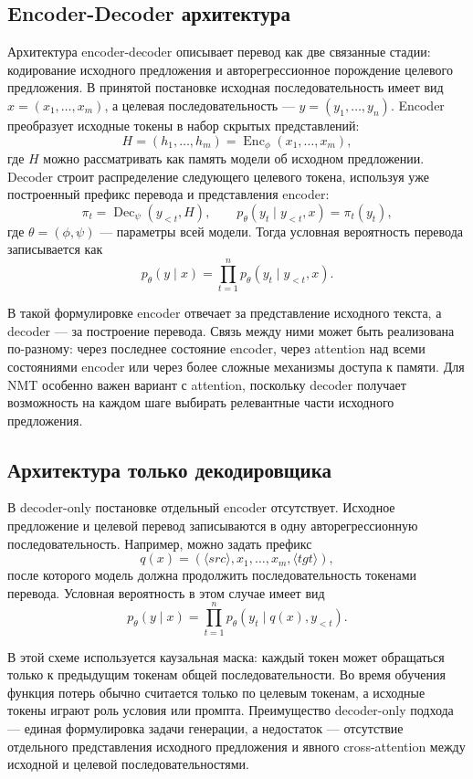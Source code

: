 \subsection{Encoder-Decoder архитектура}

Архитектура encoder-decoder описывает перевод как две связанные стадии: кодирование исходного предложения и авторегрессионное порождение целевого предложения.
В принятой постановке исходная последовательность имеет вид $x = (x_1, \ldots, x_m)$, а целевая последовательность --- $y = (y_1, \ldots, y_n)$.
Encoder преобразует исходные токены в набор скрытых представлений:
\[
	H = (h_1, \ldots, h_m) = \operatorname{Enc}_{\phi}(x_1, \ldots, x_m),
\]
где $H$ можно рассматривать как память модели об исходном предложении.
Decoder строит распределение следующего целевого токена, используя уже построенный префикс перевода и представления encoder:
\[
	\pi_t = \operatorname{Dec}_{\psi}(y_{<t}, H),
	\qquad
	p_{\theta}(y_t \mid y_{<t}, x) = \pi_t(y_t),
\]
где $\theta = (\phi, \psi)$ --- параметры всей модели.
Тогда условная вероятность перевода записывается как
\[
	p_{\theta}(y \mid x) = \prod_{t=1}^{n} p_{\theta}(y_t \mid y_{<t}, x).
\]

В такой формулировке encoder отвечает за представление исходного текста, а decoder --- за построение перевода.
Связь между ними может быть реализована по-разному: через последнее состояние encoder, через attention над всеми состояниями encoder или через более сложные механизмы доступа к памяти.
Для NMT особенно важен вариант с attention, поскольку decoder получает возможность на каждом шаге выбирать релевантные части исходного предложения.


\subsection{Архитектура только декодировщика}

В decoder-only постановке отдельный encoder отсутствует.
Исходное предложение и целевой перевод записываются в одну авторегрессионную последовательность.
Например, можно задать префикс
\[
	q(x) = (\langle src \rangle, x_1, \ldots, x_m, \langle tgt \rangle),
\]
после которого модель должна продолжить последовательность токенами перевода.
Условная вероятность в этом случае имеет вид
\[
	p_{\theta}(y \mid x) =
	\prod_{t=1}^{n} p_{\theta}(y_t \mid q(x), y_{<t}).
\]

В этой схеме используется каузальная маска: каждый токен может обращаться только к предыдущим токенам общей последовательности.
Во время обучения функция потерь обычно считается только по целевым токенам, а исходные токены играют роль условия или промпта.
Преимущество decoder-only подхода --- единая формулировка задачи генерации, а недостаток --- отсутствие отдельного представления исходного предложения и явного cross-attention между исходной и целевой последовательностями.





